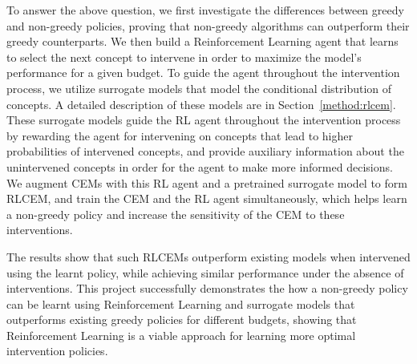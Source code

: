 \documentclass[../main.tex]{subfiles}
\begin{document}
To answer the above question, we first investigate the differences between greedy and non-greedy policies,
proving that non-greedy algorithms can outperform
their greedy counterparts. We then build a Reinforcement Learning agent
that learns to select the next concept to intervene in order to maximize the model's performance for a given budget.
To guide the agent throughout the intervention process, we utilize surrogate models that model
the conditional distribution of concepts. A detailed description of these models are in Section~\ref{method:rlcem}.
These surrogate models guide the RL agent throughout the intervention
process by rewarding the agent for intervening on concepts that lead to higher probabilities of
intervened concepts, and provide auxiliary information about the unintervened concepts
 in order for the agent to make more informed decisions.
We augment CEMs with this RL agent and a pretrained surrogate model to form RLCEM, 
and train the CEM and the RL agent simultaneously, which helps learn a non-greedy policy
and increase the sensitivity of the CEM to these interventions.

The results show that such RLCEMs
outperform existing models when intervened using the learnt policy, while achieving 
similar performance
under the absence of interventions. This project successfully demonstrates the how a non-greedy 
policy can be learnt using Reinforcement Learning and surrogate models that 
outperforms existing greedy policies for different budgets, showing that Reinforcement Learning
is a viable approach for learning more optimal intervention policies.
\end{document}
